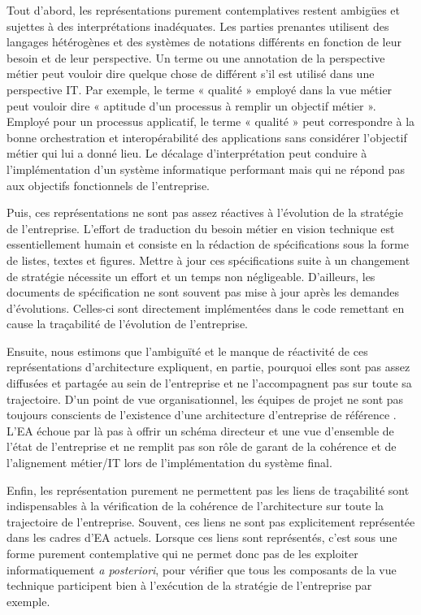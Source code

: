 	Tout d'abord, les représentations purement contemplatives restent ambigües et sujettes à des interprétations inadéquates. Les parties prenantes utilisent des langages hétérogènes et des systèmes de notations différents en fonction de leur besoin et de leur perspective. Un terme ou une annotation de la perspective métier peut vouloir dire quelque chose de différent s'il est utilisé dans une perspective IT. Par exemple, le terme « qualité » employé dans la vue métier peut vouloir dire « aptitude d'un processus à remplir un objectif métier ». Employé pour un processus applicatif, le terme « qualité » peut correspondre à la bonne orchestration et interopérabilité des applications sans considérer l'objectif métier qui lui a donné lieu. Le décalage d'interprétation peut conduire à l'implémentation d'un système informatique performant mais qui ne répond pas aux objectifs fonctionnels de l'entreprise. 
	
	Puis, ces représentations ne sont pas assez réactives à l'évolution de la stratégie de l'entreprise. L'effort de traduction du besoin métier en vision technique est essentiellement humain et consiste en la rédaction de spécifications sous la forme de listes, textes et figures. Mettre à jour ces spécifications suite à un changement de stratégie nécessite un effort et un temps non négligeable. D'ailleurs, les documents de spécification ne sont souvent pas mise à jour après les demandes d'évolutions. Celles-ci sont directement implémentées dans le code remettant en cause la traçabilité de l'évolution de l'entreprise.
	
	Ensuite, nous estimons que l'ambiguïté et le manque de réactivité de ces représentations d'architecture expliquent, en partie, pourquoi elles sont pas assez diffusées et partagée au sein de l'entreprise et ne l'accompagnent pas sur toute sa trajectoire. D'un point de vue organisationnel, les équipes de projet ne sont pas toujours conscients de l'existence d'une architecture d'entreprise de référence \cite{shah2007frameworks}. L'EA échoue par là pas à offrir un schéma directeur et une vue d'ensemble de l'état de l'entreprise et ne remplit pas son rôle de garant de la cohérence et de l'alignement métier/IT lors de l'implémentation du système final.
	
	Enfin, les représentation purement  ne permettent pas les liens de traçabilité sont indispensables à la vérification de la cohérence de l'architecture sur toute la trajectoire de l'entreprise. Souvent, ces liens ne sont pas explicitement représentée dans les cadres d'EA actuels. Lorsque ces liens sont représentés, c'est sous une forme purement contemplative qui ne permet donc pas de les exploiter informatiquement \textit{a posteriori}, pour vérifier que tous les composants de la vue technique participent bien à l'exécution de la stratégie de l'entreprise par exemple. 
	

